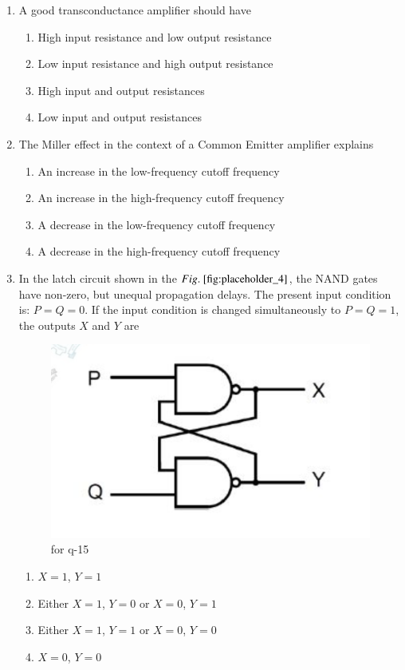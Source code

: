 \documentclass[journal,12pt,onecolumn]{IEEEtran}
\theoremstyle{remark}
\begin{document}
\begin{enumerate}
\item A good transconductance amplifier should have
\begin{enumerate}
\item High input resistance and low output resistance
\item Low input resistance and high output resistance
\item High input and output resistances
\item Low input and output resistances
\end{enumerate}
\hfill {}

\item The Miller effect in the context of a Common Emitter amplifier explains

\begin{enumerate}
\item An increase in the low-frequency cutoff frequency
\item An increase in the high-frequency cutoff frequency
\item A decrease in the low-frequency cutoff frequency
\item A decrease in the high-frequency cutoff frequency
\end{enumerate}
\hfill {}

\item In the latch circuit shown in the $\figref{fig:placeholder_4}$, the NAND gates have non-zero, but unequal propagation delays. The present input condition is: $P = Q = 0$. If the input condition is changed simultaneously to $P = Q = 1$, the outputs $X$ and $Y$ are
\begin{figure}[H]
    \centering
    \includegraphics[width=0.5\columnwidth]{figs/4.png}
    \caption{\centering for q-15}
    \label{fig:placeholder_4}
\end{figure}
\begin{multicols}{2}
\begin{enumerate}
\item $X =  1$, $Y = 1$
\item Either $X = 1$, $Y = 0$ or $X = 0$, $Y = 1$
\item Either $X = 1$, $Y = 1$ or $X = 0$, $Y = 0$
\item $X = 0$, $Y = 0$
\end{enumerate}
\end{multicols}
\hfill {}


\end{enumerate}
\end{document}

